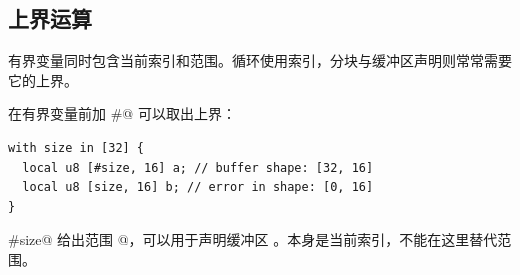 \subsection*{上界运算}

有界变量同时包含当前索引和范围。循环使用索引，分块与缓冲区声明则常常需要它的上界。

在有界变量前加 \co@#@ 可以取出上界：

\begin{lstlisting}[language=croqtile,caption={上界运算}]
with size in [32] {
  local u8 [#size, 16] a; // buffer shape: [32, 16]
  local u8 [size, 16] b; // error in shape: [0, 16]
}
\end{lstlisting}

\co@#size@ 给出范围 \co@[32, 16]@，可以用于声明缓冲区 \co@a@。\co@size@ 本身是当前索引，不能在这里替代范围。
